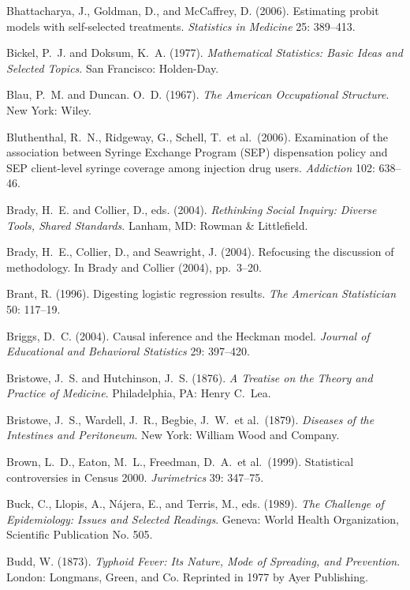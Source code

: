 \smallskip\noindent
Bhattacharya, J., Goldman, D., and McCaffrey, D. (2006).
Estimating probit models with self-selected treatments.
{\it Statistics in Medicine\/} 25: 389--413.

\smallskip\noindent
Bickel, P.~J. and Doksum, K.~A. (1977).
{\it  Mathematical Statistics: Basic Ideas and Selected Topics\/}.
San Francisco: Holden-Day.

\smallskip\noindent
Blau, P.~M. and Duncan. O.~D. (1967).
{\it The American Occupational Structure\/}.
New York: Wiley.

\smallskip\noindent
Bluthenthal, R.~N., Ridgeway, G., Schell, T.~et al.~(2006).
Examination of the association between Syringe Exchange Program (SEP) dispensation
policy and SEP client-level syringe coverage among injection drug users.
{\it Addiction\/} 102: 638--46.

\smallskip\noindent
Brady, H.~E. and Collier, D., eds. (2004).
{\it Rethinking Social Inquiry: Diverse Tools, Shared Standards\/}.
Lanham, MD: Rowman \& Littlefield.

\smallskip\noindent
Brady, H.~E., Collier, D., and Seawright, J. (2004).
Refocusing the discussion of methodology.
In Brady and Collier (2004), pp.~3--20.

\smallskip\noindent
Brant, R. (1996).
Digesting logistic regression results.
{\it The American Statistician\/} {50}: 117--19.

\smallskip\noindent
Briggs, D.~C. (2004).
Causal inference and the Heckman model.
{\it Journal of Educational and Behavioral Statistics\/} 29: 397--420.

\smallskip\noindent
Bristowe, J.~S. and Hutchinson, J.~S. (1876).
{\it A Treatise on the Theory and Practice of Medicine\/}.
Philadelphia, PA: Henry C.~Lea.

\smallskip\noindent
Bristowe, J.~S., Wardell, J.~R., Begbie, J.~W.~et al.~(1879).
{\it Diseases of the Intestines and Peritoneum\/}.
New York: William Wood and Company.

\smallskip\noindent
Brown, L.~D., Eaton, M.~L., Freedman, D.~A.~et al.~(1999).
Statistical controversies in Census 2000.
{\it Jurimetrics\/} 39: 347--75.

\smallskip\noindent
Buck, C., Llopis, A., N\'ajera, E., and Terris, M., eds. (1989).
{\it The Challenge of Epidemiology: Issues and Selected Readings\/}.
Geneva: World Health Organization, Scientific Publication No. 505.

\smallskip\noindent
Budd, W. (1873).
{\it Typhoid Fever: Its Nature, Mode of Spreading, and Prevention\/}.
London: Longmans, Green, and Co.
Reprinted in 1977 by Ayer Publishing.

